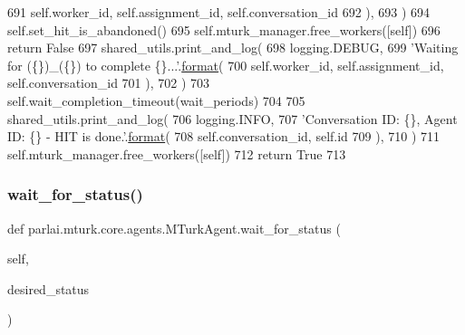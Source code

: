 \begin{DoxyCode}
691                             self.worker\_id, self.assignment\_id, self.conversation\_id
692                         ),
693                     )
694                     self.set\_hit\_is\_abandoned()
695                     self.mturk\_manager.free\_workers([self])
696                     \textcolor{keywordflow}{return} \textcolor{keyword}{False}
697             shared\_utils.print\_and\_log(
698                 logging.DEBUG,
699                 \textcolor{stringliteral}{'Waiting for (\{\})\_(\{\}) to complete \{\}...'}.\hyperlink{namespaceparlai_1_1chat__service_1_1services_1_1messenger_1_1shared__utils_a32e2e2022b824fbaf80c747160b52a76}{format}(
700                     self.worker\_id, self.assignment\_id, self.conversation\_id
701                 ),
702             )
703             self.wait\_completion\_timeout(wait\_periods)
704 
705         shared\_utils.print\_and\_log(
706             logging.INFO,
707             \textcolor{stringliteral}{'Conversation ID: \{\}, Agent ID: \{\} - HIT is done.'}.\hyperlink{namespaceparlai_1_1chat__service_1_1services_1_1messenger_1_1shared__utils_a32e2e2022b824fbaf80c747160b52a76}{format}(
708                 self.conversation\_id, self.id
709             ),
710         )
711         self.mturk\_manager.free\_workers([self])
712         \textcolor{keywordflow}{return} \textcolor{keyword}{True}
713 
\end{DoxyCode}
\mbox{\label{classparlai_1_1mturk_1_1core_1_1agents_1_1MTurkAgent_af1a00c6edfe78ac978c5bf97e88bdbe4}} 
\subsubsection{\texorpdfstring{wait\+\_\+for\+\_\+status()}{wait\_for\_status()}}
{\footnotesize\ttfamily def parlai.\+mturk.\+core.\+agents.\+M\+Turk\+Agent.\+wait\+\_\+for\+\_\+status (\begin{DoxyParamCaption}\item[{}]{self,  }\item[{}]{desired\+\_\+status }\end{DoxyParamCaption})}

